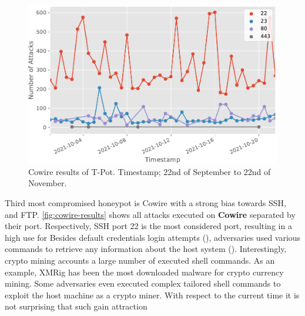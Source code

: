 \begin{figure}[ht]
    \centering
    \includegraphics[width=\textwidth]{figures/tpot-cowire-port.pdf}
    \caption[Cowire results of T-Pot]{Cowire results of T-Pot. Timestamp; 22nd of September to 22nd of November.}
    \label{fig:cowire-results}
\end{figure}

Third most compromised honeypot is Cowire with a strong bias towards SSH, and FTP.
\autoref{fig:cowire-results} shows all attacks executed on \textbf{Cowire} separated by their port.
Respectively, SSH port 22 is the most considered port, resulting in a high use for  
Besides default credentials login attempts (), adversaries used various commands to retrieve any information about the host system ().
Interestingly, crypto mining accounts a large number of executed shell commands.
As an example, XMRig has been the most downloaded malware for crypto currency mining.
Some adversaries even executed complex tailored shell commands to exploit the host machine as a crypto miner.
With respect to the current time it is not surprising that such gain attraction 

